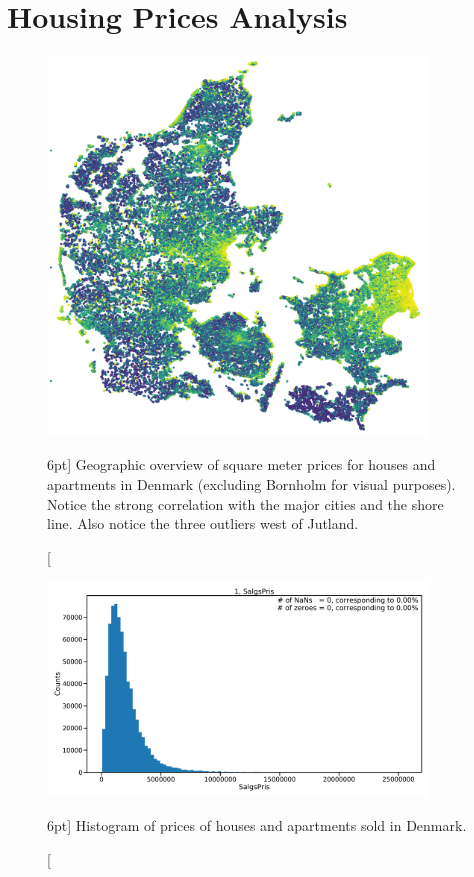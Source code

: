 \documentclass[a4paper, twoside, nobib]{tufte-book}
\begin{document}
\chapter{Housing Prices Analysis}
\label{ch:housing_price_analysis}

\begin{figure}
  \includegraphics[width=0.9\textwidth, trim=0 0 0 0, clip]{figures/housing/Denmark_Overview_SqmPrice.png}
  \caption[Geographic overview of square meter price in Denmark][6pt]
          {Geographic overview of square meter prices for houses and apartments in Denmark (excluding Bornholm for visual purposes). Notice the strong correlation with the major cities and the shore line. Also notice the three outliers west of Jutland. }
  \label{fig:h:geo_overview}
\end{figure}



\begin{figure}
  \includegraphics[width=0.9\textwidth, page=2]{figures/housing/overview_fig.pdf}
  \caption[Histogram of prices of houses and apartments sold in Denmark][6pt]
          {Histogram of prices of houses and apartments sold in Denmark.}
  \label{fig:h:price_overview}
\end{figure}
\end{document}
